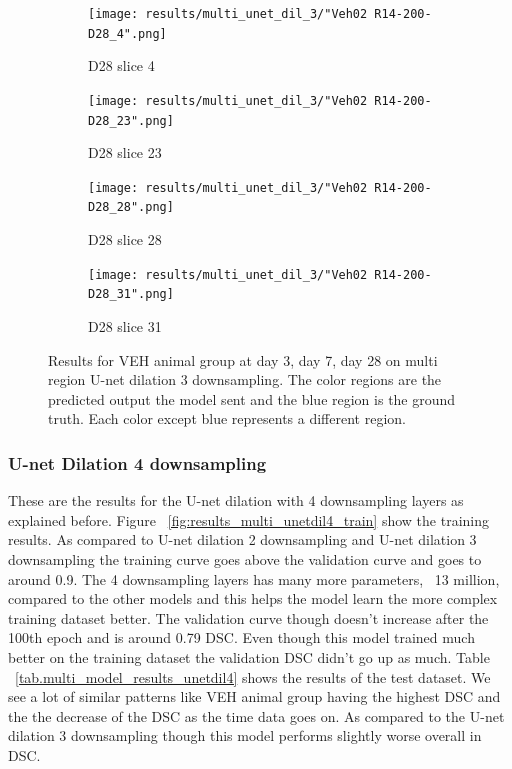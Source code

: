 \begin{figure}[!htb]
\medskip
\begin{subfigure}{0.25\textwidth}
  \texttt{[image: results/multi\_unet\_dil\_3/"Veh02 R14-200-D28\_4".png]}
  \caption{D28 slice 4}
\end{subfigure}\hfil %
\begin{subfigure}{0.25\textwidth}
  \texttt{[image: results/multi\_unet\_dil\_3/"Veh02 R14-200-D28\_23".png]}
  \caption{D28 slice 23}
\end{subfigure}\hfil %
\begin{subfigure}{0.25\textwidth}
  \texttt{[image: results/multi\_unet\_dil\_3/"Veh02 R14-200-D28\_28".png]}
  \caption{D28 slice 28}
\end{subfigure}\hfil %
\begin{subfigure}{0.25\textwidth}
  \texttt{[image: results/multi\_unet\_dil\_3/"Veh02 R14-200-D28\_31".png]}
  \caption{D28 slice 31}
\end{subfigure}
  
  \caption{Results for VEH animal group at day 3, day 7, day 28 on multi region U-net dilation 3 downsampling. The color regions are the predicted output the model sent and the blue region is the ground truth. Each color except blue represents a different region.}
  \label{fig:results_multi_unetdil3_VEH}
\end{figure}




\subsubsection{U-net Dilation 4 downsampling}
These are the results for the U-net dilation with 4 downsampling layers as explained before.
Figure ~\ref{fig:results_multi_unetdil4_train} show the training results. 
As compared to U-net dilation 2 downsampling and U-net dilation 3 downsampling the training curve goes above the validation curve and goes to around 0.9. 
The 4 downsampling layers has many more parameters, ~13 million, compared to the other models and this helps the model learn the more complex training dataset better.
The validation curve though doesn't increase after the 100th epoch and is around 0.79 DSC. 
Even though this model trained much better on the training dataset the validation DSC didn't go up as much. 
Table ~\ref{tab.multi_model_results_unetdil4} shows the results of the test dataset.
We see a lot of similar patterns like VEH animal group having the highest DSC and the the decrease of the DSC as the time data goes on. 
As compared to the U-net dilation 3 downsampling though this model performs slightly worse overall in DSC.




